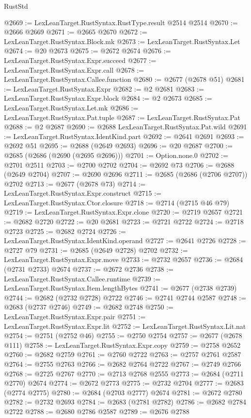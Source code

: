 \begin{lexlean}{RustStd}
\begin{coremodule}
@2669 := LexLeanTarget.RustSyntax.RustType.result @2514 @2514
@2670 := @2666 @2669
@2671 := @2665 @2670
@2672 := LexLeanTarget.RustSyntax.Block.mk
@2673 := LexLeanTarget.RustSyntax.Let
@2674 := @20 @2673
@2675 := @2672 @2674
@2676 := LexLeanTarget.RustSyntax.Expr.succeed
@2677 := LexLeanTarget.RustSyntax.Expr.call
@2678 := LexLeanTarget.RustSyntax.Callee.function
@2680 := @2677 (@2678 @51)
@2681 := LexLeanTarget.RustSyntax.Expr
@2682 := @2 @2681
@2683 := LexLeanTarget.RustSyntax.Expr.block
@2684 := @2 @2673
@2685 := LexLeanTarget.RustSyntax.Let.mk
@2686 := LexLeanTarget.RustSyntax.Pat.tuple
@2687 := LexLeanTarget.RustSyntax.Pat
@2688 := @2 @2687
@2690 := @2688 LexLeanTarget.RustSyntax.Pat.wild
@2691 := LexLeanTarget.RustSyntax.IdentKind.part
@2692 := @2641 @2691
@2693 := @2692 @51
@2695 := @2688 (@2649 @2693)
@2696 := @20 @2687
@2700 := @2685 (@2686 (@2690 (@2695 @2696)))
@2701 := Option.none.{0}
@2702 := @2701 @2511
@2703 := @2700 @2702
@2704 := @2692 @73
@2706 := @2688 (@2649 @2704)
@2707 := @2690 @2696
@2711 := @2685 (@2686 (@2706 @2707)) @2702
@2713 := @2677 (@2678 @73)
@2714 := LexLeanTarget.RustSyntax.Expr.construct
@2715 := LexLeanTarget.RustSyntax.Ctor.closure
@2718 := @2714 (@2715 @46 @79)
@2719 := LexLeanTarget.RustSyntax.Expr.clone
@2720 := @2719 @2657
@2721 := @2682 @2720
@2722 := @20 @2681
@2723 := @2721 @2722
@2724 := @2718 @2723
@2725 := @2682 @2724
@2726 := LexLeanTarget.RustSyntax.IdentKind.operand
@2727 := @2641 @2726
@2728 := @2727 @79
@2731 := @2685 (@2649 @2728) @2702
@2732 := LexLeanTarget.RustSyntax.Expr.move
@2733 := @2732 @2657
@2736 := @2684 (@2731 @2733) @2674
@2737 := @2672 @2736
@2738 := LexLeanTarget.RustSyntax.Callee.runtime
@2739 := LexLeanTarget.RustSyntax.Item.lengthBytes
@2741 := @2677 (@2738 @2739)
@2744 := @2682 (@2732 @2728) @2722
@2746 := @2741 @2744 @2587
@2748 := @2683 (@2737 @2746)
@2749 := @2682 @2748
@2750 := LexLeanTarget.RustSyntax.Expr.pair
@2751 := LexLeanTarget.RustSyntax.Expr.lit
@2752 := LexLeanTarget.RustSyntax.Lit.nat
@2754 := @2751 (@2752 @46)
@2755 := @2750 @2754
@2757 := @2677 (@2678 @111)
@2758 := LexLeanTarget.RustSyntax.Expr.copy
@2759 := @2758 @2652
@2760 := @2682 @2759
@2761 := @2760 @2722
@2763 := @2757 @2761 @2587
@2764 := @2755 @2763
@2766 := @2682 @2764 @2722
@2767 := @2749 @2766
@2768 := @2725 @2767
@2770 := @2713 @2768 @2555
@2773 := @2684 (@2711 @2770) @2674
@2774 := @2672 @2773
@2775 := @2732 @2704
@2777 := @2683 (@2774 @2775)
@2780 := @2684 (@2703 @2777) @2674
@2781 := @2672 @2780
@2782 := @2732 @2693
@2784 := @2683 (@2781 @2782)
@2786 := @2682 @2784 @2722
@2788 := @2680 @2786 @2587
@2789 := @2676 @2788

\end{coremodule}
\end{lexlean}

